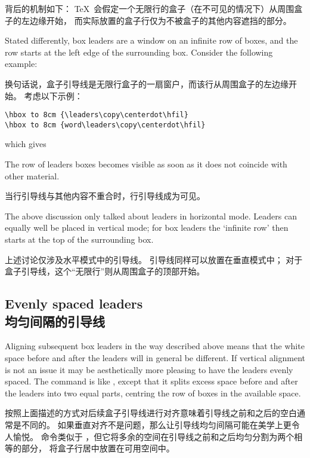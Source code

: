 背后的机制如下：
\TeX\ 会假定一个无限行的盒子（在不可见的情况下）从周围盒子的左边缘开始，
而实际放置的盒子行仅为不被盒子的其他内容遮挡的部分。

Stated differently, box leaders are a window on an infinite
row of boxes, and the row starts at the left edge of the
surrounding box. Consider the following example:

换句话说，盒子引导线是无限行盒子的一扇窗户，而该行从周围盒子的左边缘开始。
考虑以下示例：
\begin{verbatim}
\hbox to 8cm {\leaders\copy\centerdot\hfil}
\hbox to 8cm {word\leaders\copy\centerdot\hfil}
\end{verbatim}
which gives
\begin{disp}\leavevmode{}\end{disp}
The row of leaders boxes becomes visible as soon as it
does not coincide with other material.

当行引导线与其他内容不重合时，行引导线成为可见。

The above discussion only talked about leaders in horizontal
mode. Leaders can equally well be placed in vertical mode;
for box leaders the `infinite row' then starts at the top
of the surrounding box.

上述讨论仅涉及水平模式中的引导线。
引导线同样可以放置在垂直模式中；
对于盒子引导线，这个“无限行”则从周围盒子的顶部开始。


\subsection{Evenly spaced leaders\\均匀间隔的引导线}

Aligning subsequent box leaders in the way described above
means that the white space before and after the
leaders will in general be different.
If vertical alignment is not
an issue it may be aesthetically more pleasing to have
the leaders evenly spaced.
The  command is like ,
except that it splits excess space before and after the leaders
into two equal parts, centring the row of boxes in the
available space.

按照上面描述的方式对后续盒子引导线进行对齐意味着引导线之前和之后的空白通常是不同的。
如果垂直对齐不是问题，那么让引导线均匀间隔可能在美学上更令人愉悦。
 命令类似于 ，但它将多余的空间在引导线之前和之后均匀分割为两个相等的部分，
将盒子行居中放置在可用空间中。


